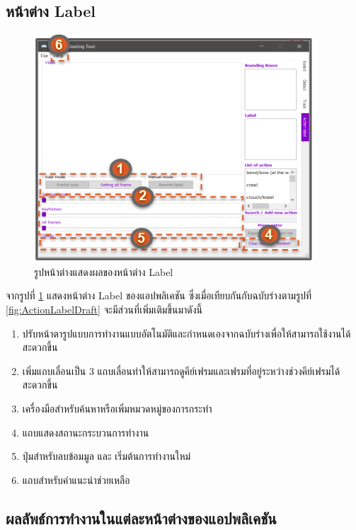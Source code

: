 \subsection*{หน้าต่าง Label}
\begin{figure}[!ht]
  \centering
    \includegraphics[scale=1.2]{chapter4/images/New_Final_ui/Label.png}
    \caption{รูปหน้าต่างแสดงผลของหน้าต่าง Label}
    \label{fig:final_label}
\end{figure}
จากรูปที่ \ref{fig:final_label} แสดงหน้าต่าง Label ของแอปพลิเคชัน ซึ่งเมื่อเทียบกันกับฉบับร่างตามรูปที่ \ref{fig:ActionLabelDraft} จะมีส่วนที่เพิ่มเติมขึ้นมาดังนี้
\begin{enumerate}
	\item ปรับหน้าตารูปแบบการทำงานแบบอัตโนมัติและกำหนดเองจากฉบับร่างเพื่อให้สามารถใช้งานได้สะดวกขึ้น
	\item เพิ่มแถบเลื่อนเป็น 3 แถบเลื่อนทำให้สามารถดูคีย์เฟรมและเฟรมที่อยู่ระหว่างช่วงคีย์เฟรมได้สะดวกขึ้น
	\item เครื่องมือสำหรับค้นหาหรือเพิ่มหมวดหมู่ของการกระทำ
	\item แถบแสดงสถานะกระบวนการทำงาน
	\item ปุ่มสำหรับลบข้อมมูล และ เริ่มต้นการทำงานใหม่ 
	\item แถบสำหรับคำแนะนำช่วยเหลือ
\end{enumerate}		

\clearpage
\subsection{ผลลัพธ์การทำงานในแต่ละหน้าต่างของแอปพลิเคชัน}
